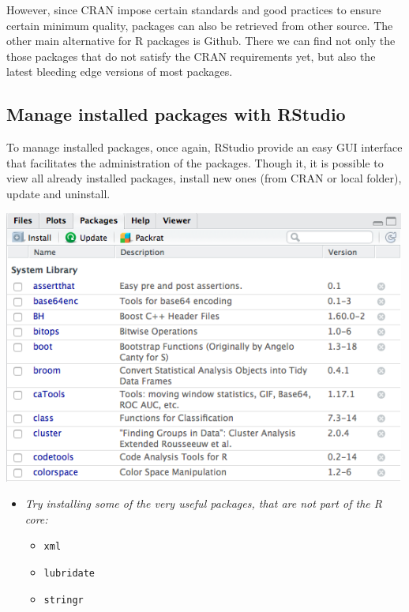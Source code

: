 \documentclass[]{article}
\providecommand{\tightlist}{%
  \setlength{\itemsep}{0pt}\setlength{\parskip}{0pt}}
\begin{document}
However, since CRAN impose certain standards and good practices to
ensure certain minimum quality, packages can also be retrieved from
other source. The other main alternative for R packages is Github. There
we can find not only the those packages that do not satisfy the CRAN
requirements yet, but also the latest bleeding edge versions of most
packages.

\subsection{Manage installed packages with
RStudio}\label{manage-installed-packages-with-rstudio}

To manage installed packages, once again, RStudio provide an easy GUI
interface that facilitates the administration of the packages. Though
it, it is possible to view all already installed packages, install new
ones (from CRAN or local folder), update and uninstall.

\begin{center}\includegraphics[width=500px]{figures/manage_packages} \end{center}

\begin{itemize}
\tightlist
\item
  \emph{Try installing some of the very useful packages, that are not
  part of the R core:}

  \begin{itemize}
  \tightlist
  \item
    \texttt{xml}
  \item
    \texttt{lubridate}
  \item
    \texttt{stringr}
  \end{itemize}
\end{itemize}
\end{document}
